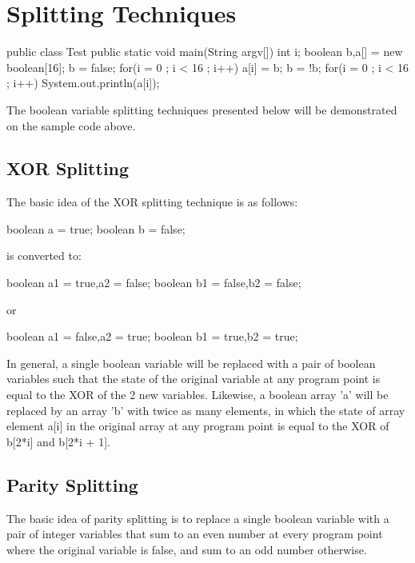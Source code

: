 \section{Splitting Techniques}
\begin{listing}{1}

public class Test {
    public static void main(String argv[]) {
	int i;
	boolean b,a[] = new boolean[16];
	b = false;
	for(i = 0 ; i < 16 ; i++) {
	    a[i] = b;
	    b = !b;
	}
	for(i = 0 ; i < 16 ; i++) {
	    System.out.println(a[i]);
	}
    }
}

\end{listing}

The boolean variable splitting techniques presented below will
be demonstrated on the sample code above.


\subsection{XOR Splitting}

The basic idea of the XOR splitting technique is as follows:

\begin{listing}{1}
	boolean a = true;
	boolean b = false;
\end{listing}

is converted to:

\begin{listing}{1}
	boolean a1 = true,a2 = false;
	boolean b1 = false,b2 = false;
\end{listing}

or

\begin{listing}{1}
	boolean a1 = false,a2 = true;
	boolean b1 = true,b2 = true;
\end{listing}

In general, a single boolean variable will be replaced with a pair of boolean
variables such that the state of the original variable at any program point
is equal to the XOR of the 2 new variables.  Likewise, a boolean array 'a' will 
be replaced by an array 'b' with twice as many elements, in which the state of
array element a[i] in the original array at any program point is equal to the XOR
of b[2*i] and b[2*i + 1].

\subsection{Parity Splitting}

The basic idea of parity splitting is to replace a single boolean variable
with a pair of integer variables that sum to an even number at every program
point where the original variable is false, and sum to an odd number otherwise.

